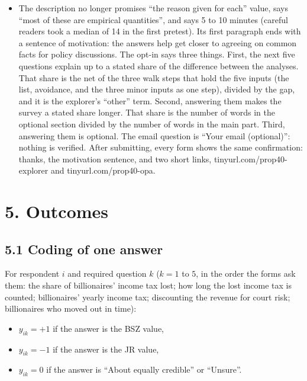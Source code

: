 \begin{itemize}
  ``Counted'' and ``Not counted''). In the first pretest the bare JR values (``None.'', ``Not counted.'') drew
  0 or 1 choices each. The avoidance question keeps its first-pretest text (``5\%: a small allowance argued
  from enforcement.'' against ``None.''), the author's choice. The BSZ value of the wealth total now says how much of that total belongs to
  the non-US citizens asked about in the next question.
\item
  The description no longer promises ``the reason given for each'' value, says ``most of these are
  empirical quantities'', and says 5 to 10 minutes (careful readers took a median of 14 in the
  first pretest). Its first paragraph ends with a sentence of motivation: the answers help get
  closer to agreeing on common facts for policy discussions. The opt-in says three things. First,
  the next five questions explain up to a stated share of the difference between the analyses.
  That share is the net of the three walk steps that hold the five inputs (the list, avoidance,
  and the three minor inputs as one step), divided by the gap, and it is the explorer's ``other''
  term. Second, answering them makes the survey a stated share longer. That share is the number
  of words in the optional section divided by the number of words in the main part. Third,
  answering them is optional. The email question is ``Your email (optional)'':
  nothing is verified. After submitting, every form shows the same confirmation: thanks, the
  motivation sentence, and two short links, tinyurl.com/prop40-explorer and tinyurl.com/prop40-opa.
\end{itemize}

\section{5. Outcomes}\label{outcomes}

\subsection{5.1 Coding of one answer}\label{coding-of-one-answer}

For respondent \(i\) and required question \(k\) (\(k = 1\) to \(5\), in the order the forms ask them: the share
of billionaires' income tax lost; how long the lost income tax is counted; billionaires' yearly
income tax; discounting the revenue for court risk; billionaires who moved out in time):

\begin{itemize}
\tightlist
\item
  \(y_{ik} = +1\) if the answer is the BSZ value,
\item
  \(y_{ik} = -1\) if the answer is the JR value,
\item
  \(y_{ik} = 0\) if the answer is ``About equally credible'' or ``Unsure''.
\end{itemize}

